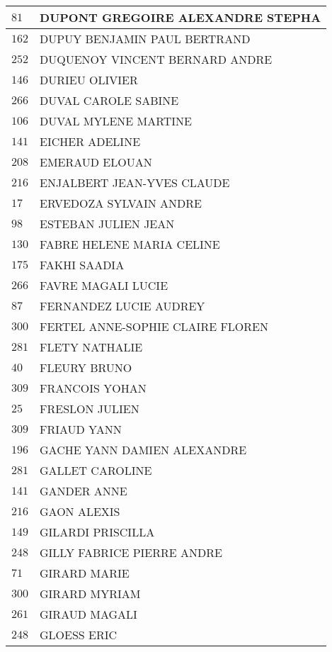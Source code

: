 \begin{xltabular}{\linewidth}{|l|X|}
    \hline
    $81$ & DUPONT GREGOIRE ALEXANDRE STEPHA \\
    \hline
    $162$ & DUPUY BENJAMIN PAUL BERTRAND \\
    \hline
    $252$ & DUQUENOY VINCENT BERNARD ANDRE \\
    \hline
    $146$ & DURIEU OLIVIER \\
    \hline
    $266$ & DUVAL CAROLE SABINE \\
    \hline
    $106$ & DUVAL MYLENE MARTINE \\
    \hline
    $141$ & EICHER ADELINE \\
    \hline
    $208$ & EMERAUD ELOUAN \\
    \hline
    $216$ & ENJALBERT JEAN-YVES CLAUDE \\
    \hline
    $17$ & ERVEDOZA SYLVAIN ANDRE \\
    \hline
    $98$ & ESTEBAN JULIEN JEAN \\
    \hline
    $130$ & FABRE HELENE MARIA CELINE \\
    \hline
    $175$ & FAKHI SAADIA \\
    \hline
    $266$ & FAVRE MAGALI LUCIE \\
    \hline
    $87$ & FERNANDEZ LUCIE AUDREY \\
    \hline
    $300$ & FERTEL ANNE-SOPHIE CLAIRE FLOREN \\
    \hline
    $281$ & FLETY NATHALIE \\
    \hline
    $40$ & FLEURY BRUNO \\
    \hline
    $309$ & FRANCOIS YOHAN \\
    \hline
    $25$ & FRESLON JULIEN \\
    \hline
    $309$ & FRIAUD YANN \\
    \hline
    $196$ & GACHE YANN DAMIEN ALEXANDRE \\
    \hline
    $281$ & GALLET CAROLINE \\
    \hline
    $141$ & GANDER ANNE \\
    \hline
    $216$ & GAON ALEXIS \\
    \hline
    $149$ & GILARDI PRISCILLA \\
    \hline
    $248$ & GILLY FABRICE PIERRE ANDRE \\
    \hline
    $71$ & GIRARD MARIE \\
    \hline
    $300$ & GIRARD MYRIAM \\
    \hline
    $261$ & GIRAUD MAGALI \\
    \hline
    $248$ & GLOESS ERIC \\

\end{xltabular}
